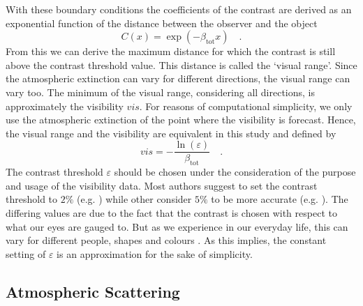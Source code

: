 With these boundary conditions the coefficients of the contrast are derived as an exponential function of the distance between the observer and the object
\begin{equation}
    C(x)=\exp (-\beta_{\mathrm{tot}}x) \quad .
\end{equation}
From this we can derive the maximum distance for which the contrast is still above the contrast threshold value. This distance is called the `visual range'. Since the atmospheric extinction can vary for different directions, the visual range can vary too. The minimum of the visual range, considering all directions, is approximately the visibility $vis$. For reasons of computational simplicity, we only use the atmospheric extinction of the point where the visibility is forecast. Hence, the visual range and the visibility are equivalent in this study and defined by 
\begin{equation}
    vis = -\frac{ \ln ( \varepsilon)} { \beta_{\mathrm{tot}}}    \quad .
    \label{visibility}
\end{equation}
The contrast threshold $\varepsilon$ should be chosen under the consideration of the purpose and usage of the visibility data.
Most authors suggest to set the contrast threshold to $2 \% $ (e.g. \citeauthor{ballard1992diagnosis} \cite{ballard1992diagnosis}) while other consider  $5 \% $ to be more accurate  (e.g. \citeauthor{claxton2008using} \cite{claxton2008using}). 
The differing values are due to the fact that the contrast is chosen with respect to what our eyes are gauged to. But as we experience in our everyday life, this can vary for different people, shapes and colours \parencite{koschmeider1924theorie}. As this implies, the constant setting of $\varepsilon$ is an approximation for the sake of simplicity. 






\subsection{Atmospheric Scattering}


